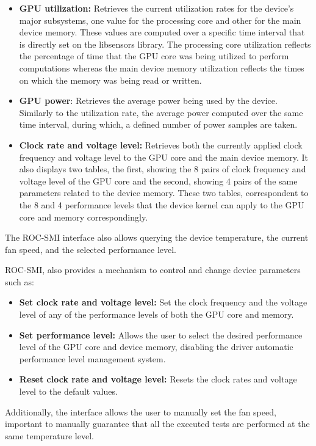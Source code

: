 \begin{itemize}
\item \textbf{GPU utilization:} Retrieves the current utilization rates for the device's major subsystems, one value for the processing core and other for the main device memory. These values are computed over a specific time interval that is directly set on the libsensors library. The processing core utilization reflects the percentage of time that the GPU core was being utilized to perform computations whereas the main device memory utilization reflects the times on which the memory was being read or written.

\item \textbf{GPU power}: Retrieves the average power being used by the device. Similarly to the utilization rate, the average power computed over the same time interval, during which, a defined number of power samples are taken.

\item \textbf{Clock rate and voltage level:} Retrieves both the currently applied clock frequency and voltage level to the GPU core and the main device memory. It also displays two tables, the first, showing the 8 pairs of clock frequency and voltage level of the GPU core and the second, showing 4 pairs of the same parameters related to the device memory. These two tables, correspondent to the 8 and 4 performance levels that the device kernel can apply to the GPU core and memory correspondingly.
\end{itemize}

The ROC-SMI interface also allows querying the device temperature, the current fan speed, and the selected performance level.

ROC-SMI, also provides a mechanism to control and change device parameters such as:
\begin{itemize}
\item \textbf{Set clock rate and voltage level:} Set the clock frequency and the voltage level of any of the performance levels of both the GPU core and memory. 
\item \textbf{Set performance level:} Allows the user to select the desired performance level of the GPU core and device memory, disabling the driver automatic performance level management system.
\item \textbf{Reset clock rate and voltage level:} Resets the clock rates and voltage level to the default values.
\end{itemize}

Additionally, the interface allows the user to manually set the fan speed, important to manually guarantee that all the executed tests are performed at the same temperature level.

